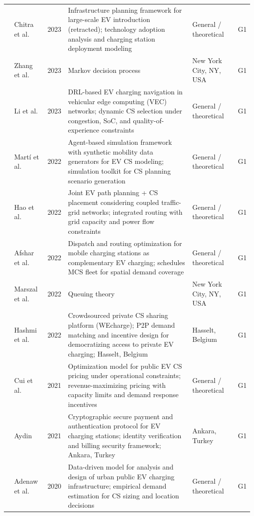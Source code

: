 \documentclass[letterpaper, 12pt, oneside, doublespacing]{Thesis}
\begin{document}
\begin{longtable}{L{0.9cm} L{2.2cm} L{0.8cm} L{3.3cm} L{2.5cm} L{1.5cm}}
\cite{retracted_charging_2023} & Chitra et al. & 2023 & Infrastructure planning framework for large-scale EV introduction (retracted); technology adoption analysis and charging station deployment modeling & General {\slash} theoretical & G1 \\
\cite{routing_and_2023} & Zhang et al. & 2023 & Markov decision process & New York City, NY, USA & G1 \\
\cite{smart_and_2023} & Li et al. & 2023 & DRL-based EV charging navigation in vehicular edge computing (VEC) networks; dynamic CS selection under congestion, SoC, and quality-of-experience constraints & General {\slash} theoretical & G1 \\
\cite{charging_stations_2022} & Mart\'i et al. & 2022 & Agent-based simulation framework with synthetic mobility data generators for EV CS modeling; simulation toolkit for CS planning scenario generation & General {\slash} theoretical & G1 \\
\cite{integrated_electric_2022} & Hao et al. & 2022 & Joint EV path planning + CS placement considering coupled traffic-grid networks; integrated routing with grid capacity and power flow constraints & General {\slash} theoretical & G1 \\
\cite{mobile_charging_2022} & Afshar et al. & 2022 & Dispatch and routing optimization for mobile charging stations as complementary EV charging; schedules MCS fleet for spatial demand coverage & General {\slash} theoretical & G1 \\
\cite{phase_separation_2022} & Marszal et al. & 2022 & Queuing theory & New York City, NY, USA & G1 \\
\cite{wecharge_democratizing_2022} & Hashmi et al. & 2022 & Crowdsourced private CS sharing platform (WEcharge); P2P demand matching and incentive design for democratizing access to private EV charging; Hasselt, Belgium & Hasselt, Belgium & G1 \\
\cite{optimal_pricing_2021} & Cui et al. & 2021 & Optimization model for public EV CS pricing under operational constraints; revenue-maximizing pricing with capacity limits and demand response incentives & General {\slash} theoretical & G1 \\
\cite{secure_charging_2021} & Aydin & 2021 & Cryptographic secure payment and authentication protocol for EV charging stations; identity verification and billing security framework; Ankara, Turkey & Ankara, Turkey & G1 \\
\cite{a_model_2020} & Adenaw et al. & 2020 & Data-driven model for analysis and design of urban public EV charging infrastructure; empirical demand estimation for CS sizing and location decisions & General {\slash} theoretical & G1 \\

\end{longtable}
\end{document}
